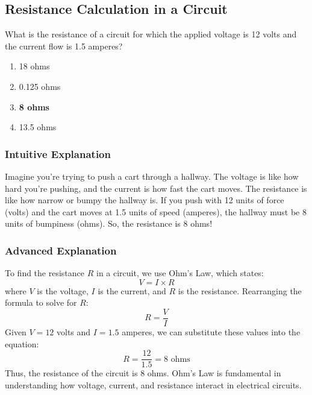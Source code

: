 \subsection{Resistance Calculation in a Circuit}
\label{T5D05}

\begin{tcolorbox}[colback=gray!10!white,colframe=black!75!black,title=T5D05]
What is the resistance of a circuit for which the applied voltage is 12 volts and the current flow is 1.5 amperes?
\begin{enumerate}[label=\Alph*)]
    \item 18 ohms
    \item 0.125 ohms
    \item \textbf{8 ohms}
    \item 13.5 ohms
\end{enumerate}
\end{tcolorbox}

\subsubsection{Intuitive Explanation}
Imagine you're trying to push a cart through a hallway. The voltage is like how hard you're pushing, and the current is how fast the cart moves. The resistance is like how narrow or bumpy the hallway is. If you push with 12 units of force (volts) and the cart moves at 1.5 units of speed (amperes), the hallway must be 8 units of bumpiness (ohms). So, the resistance is 8 ohms!

\subsubsection{Advanced Explanation}
To find the resistance \( R \) in a circuit, we use Ohm's Law, which states:
\[
V = I \times R
\]
where \( V \) is the voltage, \( I \) is the current, and \( R \) is the resistance. Rearranging the formula to solve for \( R \):
\[
R = \frac{V}{I}
\]
Given \( V = 12 \) volts and \( I = 1.5 \) amperes, we can substitute these values into the equation:
\[
R = \frac{12}{1.5} = 8 \text{ ohms}
\]
Thus, the resistance of the circuit is 8 ohms. Ohm's Law is fundamental in understanding how voltage, current, and resistance interact in electrical circuits.

